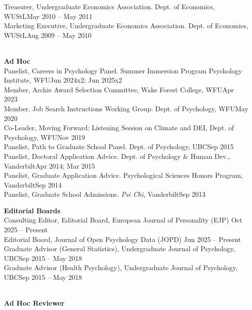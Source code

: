 \begin{minipage}{\linewidth}\vspace{1.1mm} Treasurer, Undergraduate Economics Association. Dept. of Economics, WUStL\hfill{May 2010 – May 2011}\\
Marketing Executive, Undergraduate Economics Association. Dept. of Economics, WUStL\hfill {Aug 2009 – May 2010}\end{minipage}\medskip\\
\textrm{\textbf{Ad Hoc}}\\
Panelist, Careers in Psychology Panel. Summer Immersion Program Psychology Institute, WFU\hfill {Jun 2024x2; Jun 2025x2}\\ %
Member, Archie Award Selection Committee, Wake Forest College, WFU\hfill{Apr 2023}\\ 
Member, Job Search Instructions Working Group. Dept. of Psychology, WFU\hfill{May 2020}\\
Co-Leader, Moving Forward: Listening Session on Climate and DEI, Dept. of Psychology, WFU\hfill {Nov 2019}\\
Panelist, Path to Graduate School Panel. Dept. of Psychology, UBC\hfill {Sep 2015}\\
Panelist, Doctoral Application Advice. Dept. of Psychology \& Human Dev., Vanderbilt\hfill {Apr 2014; Mar 2015}\\
Panelist, Graduate Application Advice. Psychological Sciences Honors Program, Vanderbilt\hfill {Sep 2014}\\
Panelist, Graduate School Admissions. \textit{Psi Chi}, Vanderbilt\hfill{Sep 2013}\medskip\\
%
%
\begin{minipage}{\linewidth}\vspace{1.1mm} {\large \textbf{Editorial Boards}}\\
Consulting Editor, Editorial Board, European Journal of Personality (EJP) \hfill{Oct 2025 – Present}\\
Editorial Board, Journal of Open Psychology Data (JOPD) \hfill{Jun 2025 – Present}\\
Graduate Advisor (General Statistics), Undergraduate Journal of Psychology, UBC\hfill{Sep 2015 – May 2018}\\
Graduate Advisor (Health Psychology), Undergraduate Journal of Psychology, UBC\hfill{Sep 2015 – May 2018}\end{minipage}\medskip\\
{\large \textbf{Ad Hoc Reviewer}}\smallskip\\
